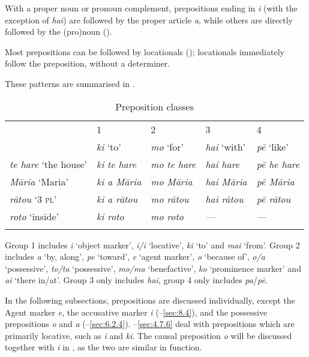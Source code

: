 With a proper noun or pronoun complement, prepositions ending in \textit{i} (with the exception of \textit{hai}) are followed by the proper article \textit{a}, while others are directly followed by the (pro)noun (). 

Most prepositions can be followed by locationals (); locationals immediately follow the preposition, without a determiner.

These patterns are summarised in .

\begin{table}
\begin{tabularx}{\textwidth}{XL{19mm}L{19mm}L{19mm}L{18mm}} 
\lsptoprule
&  {1} &  {2} &  {3} &  {4}\\
& \textit{ki} ‘to’ & \textit{mo} ‘for’ & \textit{hai} ‘with’ & \textit{pē} ‘like’\\
\midrule
\textit{te hare} ‘the house’ & \textit{ki te hare} & \textit{mo te hare} & \textit{hai hare} & \textit{pē he hare}\\
\textit{Māria} ‘Maria’ & \textit{ki a Māria} & \textit{mo Māria} & \textit{hai Māria}\footnotemark{} & \textit{pē Māria}\\
\textit{rātou} ‘3 \textsc{pl}’ & \textit{ki a rātou} & \textit{mo rātou} & \textit{hai rātou} & \textit{pē rātou}\\
{\textit{roto} ‘inside’} & {\textit{ki roto}} & {\textit{mo roto}} & \textit{—} & {\textit{—}}\\
\lspbottomrule
\end{tabularx}
\caption{Preposition classes}
\label{tab:34}
\end{table}



Group 1 includes \textit{i} ‘object marker’, \textit{i/{\ꞌ}i} ‘locative’, \textit{ki} ‘to’ and \textit{mai} ‘from’. Group 2 includes \textit{a} ‘by, along’, \textit{pe} ‘toward’, \textit{e} ‘agent marker’, \textit{{\ꞌ}o} ‘because of’, \textit{o/{\ꞌ}a} ‘possessive’, \textit{to/ta} ‘possessive’, \textit{mo/ma} ‘benefactive’, \textit{ko} ‘prominence marker’ and \textit{{\ꞌ}ai} ‘there in/at’. Group 3 only includes \textit{hai}, group 4 only includes \textit{pa}/\textit{pē}. 

In the following subsections, prepositions are discussed individually, except the Agent marker \textit{e}, the accusative marker \textit{i} (–\ref{sec:8.4}), and the possessive prepositions \textit{o} and \textit{{\ꞌ}a} (–\ref{sec:6.2.4}). –\ref{sec:4.7.6} deal with prepositions which are primarily locative, such as \textit{{\ꞌ}i} and \textit{ki}. The causal preposition \textit{{\ꞌ}o} will be discussed together with \textit{{\ꞌ}i} in , as the two are similar in function.

